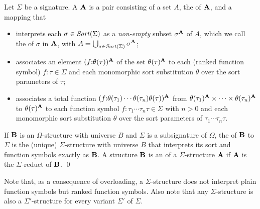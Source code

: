 \begin{definition}
Let $\Sigma$ be a signature.
A  $\mathbf{A}$ is a pair consisting of 
a set $A$,  the  of $\mathbf{A}$, and 
a mapping that

\begin{itemize}
\item interprets
each $\sigma \in \mathit{Sort}(\Sigma)$ as a \emph{non-empty} subset $\sigma^{\mathbf{A}}$ of $A$,
which we call the  of $\sigma$ in $\mathbf{A}$,
with $A = \bigcup_{\sigma \in \mathit{Sort}(\Sigma)} \sigma^{\mathbf{A}}$;

\item associates
an element $(f{:}\theta(\tau))^{\mathbf{A}}$ of the set $\theta(\tau)^{\mathbf{A}}$ to
each (ranked function symbol) $f{:}\tau \in \Sigma$ 
and each monomorphic sort substitution $\theta$ over the sort parameters of $\tau$;

\item associates
a total function 
$(f{:}\theta(\tau_1)\cdots\theta(\tau_n)\theta(\tau))^{\mathbf{A}}$ 
from $\theta(\tau_1)^{\mathbf{A}} \times \cdots \times \theta(\tau_n)^{\mathbf{A}}$ to
$\theta(\tau)^{\mathbf{A}}$ to each function symbol $f{:}\tau_1\cdots\tau_n\tau \in \Sigma$ with $n > 0$ 
and each monomorphic sort substitution $\theta$ over the sort parameters of $\tau_1\cdots\tau_n\tau$.
\end{itemize}

If $\mathbf{B}$ is an $\Omega$-structure with universe $B$ and 
$\Sigma$ is a subsignature of $\Omega$,
the  of $\mathbf{B}$ to $\Sigma$ is the (unique) 
$\Sigma$-structure with universe $B$
that interprets its sort and function symbols exactly as $\mathbf{B}$.
A structure $\mathbf{B}$ is an  of a $\Sigma$-structure $\mathbf{A}$
if $\mathbf{A}$ is the $\Sigma$-reduct of $\mathbf{B}$.
\qed
\end{definition}

Note that, as a consequence of overloading,
a $\Sigma$-structure does not interpret plain function symbols
but ranked function symbols.
Also note that 
any $\Sigma$-structure is also a $\Sigma'$-structure 
for every variant $\Sigma'$ of $\Sigma$.


